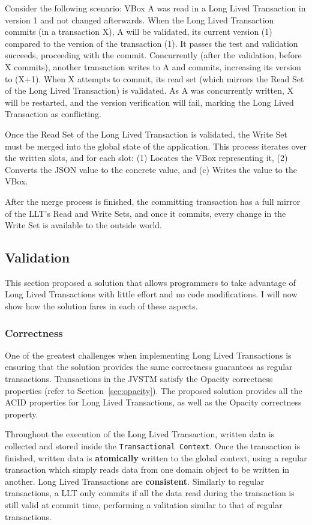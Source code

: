 \documentclass{llncs}
\begin{document}
Consider the following scenario: VBox A was read in a Long Lived
Transaction in version 1 and not changed afterwards. When the Long
Lived Transaction commits (in a transaction X), A will be validated,
its current version (1) compared to the version of the transaction
(1). It passes the test and validation succeeds, proceeding with the
commit. Concurrently (after the validation, before X commits), another
transaction writes to A and commits, increasing its version to (X+1). When
X attempts to commit, its read set (which mirrors the Read Set of the
Long Lived Transaction) is validated. As A was concurrently written, X
will be restarted, and the version verification will fail, marking the
Long Lived Transaction as conflicting.

Once the Read Set of the Long Lived Transaction is validated, the
Write Set must be merged into the global state of the
application. This process iterates over the written slots, and for
each slot: (1) Locates the VBox representing it, (2) Converts the JSON
value to the concrete value, and (c) Writes the value to the VBox.

After the merge process is finished, the committing transaction has a
full mirror of the LLT's Read and Write Sets, and once it commits,
every change in the Write Set is available to the outside world.

\subsection{Validation}
\label{sec:validation}

This section proposed a solution that allows programmers to take
advantage of Long Lived Transactions with little effort and no code
modifications. I will now show how the solution fares in each of these
aspects.

\subsubsection{Correctness}

One of the greatest challenges when implementing Long Lived
Transactions is ensuring that the solution provides the same
correctness guarantees as regular transactions. Transactions in the
JVSTM satisfy the Opacity correctness properties (refer to
Section~\ref{sec:opacity}). The proposed solution provides all the
ACID properties for Long Lived Transactions, as well as the Opacity
correctness property.

Throughout the execution of the Long Lived Transaction, written data
is collected and stored inside the \texttt{Transactional Context}. Once
the transaction is finished, written data is {\bf atomically} written
to the global context, using a regular transaction which simply reads
data from one domain object to be written in another.  Long Lived
Transactions are {\bf consistent}. Similarly to regular transactions,
a LLT only commits if all the data read during the transaction is
still valid at commit time, performing a valitation similar to that of
regular transactions.
\end{document}
